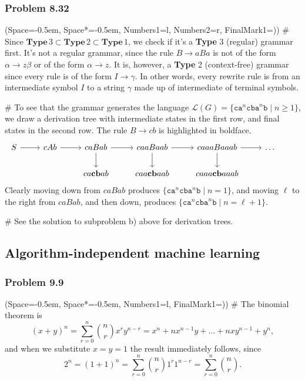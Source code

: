 \documentclass[12pt, a4paper]{article}
\newcommand{\listSpace}{-0.5em}%
\begin{document}
{\subsubsection*{Problem 8.32}
\begin{easylist}[enumerate]
	\ListProperties(Space=\listSpace, Space*=\listSpace, Numbers1=l, Numbers2=r, FinalMark1={)})
	# Since $\mathbf{Type } \, 3 \subset \mathbf{Type } \, 2 \subset \mathbf{Type } \, 1$, we check if it's a \textbf{Type} 3 (regular) grammar first.
	It's not a regular grammar, since the rule $B \to aBa$ is not of the form $\alpha \to z \beta$ or of the form $\alpha \to z$.
	It is, however,  a \textbf{Type} 2 (context-free) grammar since every rule is of the form $I \to \gamma$.
	In other words, every rewrite rule is from an intermediate symbol $I$ to a string $\gamma$ made up of intermediate of terminal symbols.
	
	# To see that the grammar generates the language $\mathcal{L}(G) =
	 \{   \mathtt{ca}^n \mathtt{cba}^n \mathtt{b} \mid n \geq 1   \}$, we draw a derivation tree with intermediate states in the first row, and final states in the second row.
	 The rule $B \to cb$ is highlighted in boldface.
	\begin{equation*}
	\begin{tikzcd}
	S \arrow{r} & \arrow{r}  cAb & \arrow{r} \arrow{d} caBab &  \arrow{r} \arrow{d} caaBaab & caaaBaaab \arrow{d} \arrow{r} & \dots  \\
	&   & ca\mathbf{cb}ab & caa\mathbf{cb}aab & caaa\mathbf{cb}aaab & &
	\end{tikzcd}
	\end{equation*}
	Clearly moving down from $caBab$ produces $\{   \mathtt{ca}^n \mathtt{cba}^n \mathtt{b} \mid n =1   \}$, and moving $\ell$ to the right from $caBab$, and then down, produces $\{   \mathtt{ca}^n \mathtt{cba}^n \mathtt{b} \mid n = \ell + 1   \}$.
	
	# See the solution to subproblem b) above for derivation trees.
\end{easylist}




\clearpage
\subsection{Algorithm-independent machine learning}

\subsubsection*{Problem 9.9}
\begin{easylist}[enumerate]
\ListProperties(Space=\listSpace, Space*=\listSpace, Numbers1=l, FinalMark1={)})
# The binomial theorem is
\begin{equation*}
	(x + y)^n = \sum_{r=0}^{n} \binom{n}{r} x^r y^{n-r}
	= x^n + n x^{n-1}y + \dots + n xy^{n-1} + y^n,
\end{equation*}
and when we substitute $x=y=1$ the result immediately follows, since
\begin{equation*}
2^n = (1 + 1)^n = \sum_{r=0}^{n} \binom{n}{r} 1^r 1^{n-r} 
= \sum_{r=0}^{n} \binom{n}{r}.
\end{equation*}


\end{easylist}}
\end{document}
